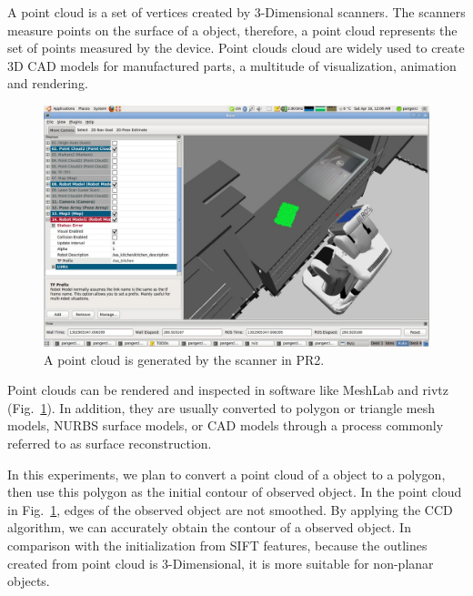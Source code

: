 A point cloud is a set of vertices created by 3-Dimensional
scanners. The scanners measure points on the surface of a object,
therefore, a point cloud represents the set of points measured by the
device. Point clouds cloud are widely used to  create 3D CAD models
for manufactured parts, a multitude of visualization, animation and
rendering.
\begin{figure}[htb]
  \centering
  \includegraphics[width=\linewidth]{images/pr2b.jpg}
  \caption[Point cloud of a book rendered in rivz]{A point cloud is
    generated by the scanner in PR2.}
  \label{fig:pointcloud}
\end{figure}

Point clouds can be rendered and inspected in software like MeshLab
and rivtz (Fig.~\ref{fig:pointcloud}). In addition, they are usually converted to polygon or
triangle mesh models, NURBS surface models, or CAD models through a
process commonly referred to as surface reconstruction.

In this experiments, we plan to convert a point cloud of a object to a
polygon, then use this polygon as the initial contour of observed
object. In the point cloud in Fig.~\ref{fig:pointcloud}, edges of
the observed object are not smoothed. By applying the CCD algorithm,
we can accurately obtain the contour of a observed object. In
comparison with the initialization from SIFT features, because the
outlines created from point cloud is 3-Dimensional, it is more
suitable for non-planar objects.

